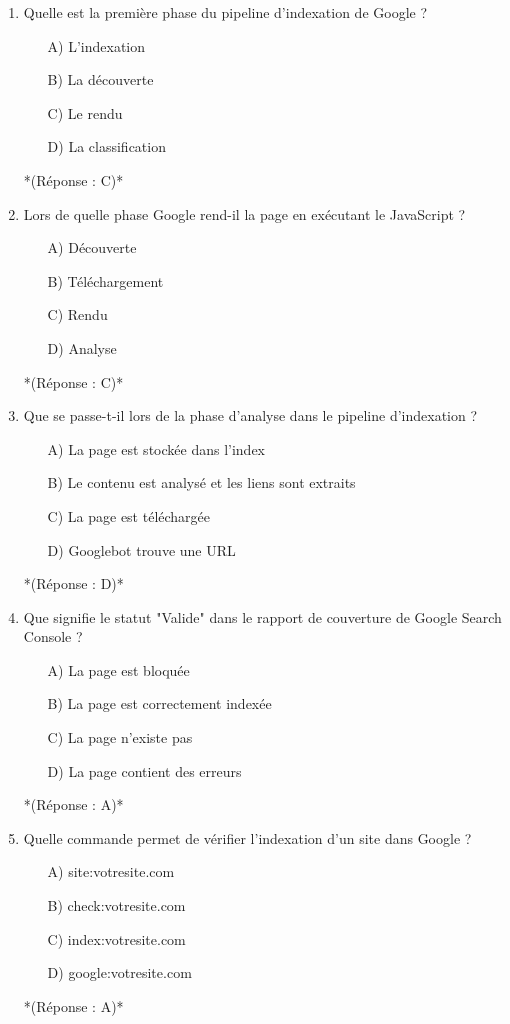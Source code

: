 \documentclass[12pt,a4paper,twoside]{report}
\begin{document}
\begin{enumerate}
\item Quelle est la première phase du pipeline d'indexation de Google ?
\begin{itemize}
\item[A)] L'indexation
\item[B)] La découverte
\item[C)] Le rendu
\item[D)] La classification
\end{itemize}
*(Réponse : C)*

\item Lors de quelle phase Google rend-il la page en exécutant le JavaScript ?
\begin{itemize}
\item[A)] Découverte
\item[B)] Téléchargement
\item[C)] Rendu
\item[D)] Analyse
\end{itemize}
*(Réponse : C)*

\item Que se passe-t-il lors de la phase d'analyse dans le pipeline d'indexation ?
\begin{itemize}
\item[A)] La page est stockée dans l'index
\item[B)] Le contenu est analysé et les liens sont extraits
\item[C)] La page est téléchargée
\item[D)] Googlebot trouve une URL
\end{itemize}
*(Réponse : D)*

\item Que signifie le statut "Valide" dans le rapport de couverture de Google Search Console ?
\begin{itemize}
\item[A)] La page est bloquée
\item[B)] La page est correctement indexée
\item[C)] La page n'existe pas
\item[D)] La page contient des erreurs
\end{itemize}
*(Réponse : A)*

\item Quelle commande permet de vérifier l'indexation d'un site dans Google ?
\begin{itemize}
\item[A)] site:votresite.com
\item[B)] check:votresite.com
\item[C)] index:votresite.com
\item[D)] google:votresite.com
\end{itemize}
*(Réponse : A)*


\end{enumerate}
\end{document}

